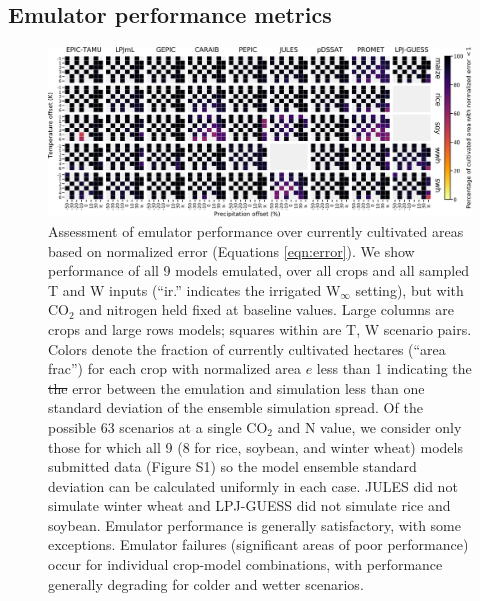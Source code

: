 \documentclass[gmdd]{copernicus} %
\providecommand{\DIFdel}[1]{{\protect\color{red}\sout{#1}}}                      %
\providecommand{\DIFdelFL}[1]{\DIFdel{#1}} %
\providecommand{\DIFdelbeginFL}{} %
\providecommand{\DIFdelendFL}{} %
\begin{document}
\subsection{Emulator performance metrics}
\label{S:4.2}
\begin{figure}[ht]
\centering
    \includegraphics[width=16.3cm]{figures/error_grid_new.png}
    \caption{
    Assessment of emulator performance over currently cultivated areas based on normalized error (Equations \ref{eqn:error}). 
    We show performance of all 9 models emulated, over all crops and all sampled T and W inputs (``ir.'' indicates the irrigated W$_{\infty}$ setting), but with CO$_2$ and nitrogen held fixed at baseline values. 
    Large columns are crops and large rows models; squares within are T, W scenario pairs. 
    Colors denote the fraction of currently cultivated hectares (``area frac'') for each crop with normalized area $e$ less than 1 indicating the \DIFdelbeginFL \DIFdelFL{the }\DIFdelendFL error between the emulation and simulation less than one standard deviation of the ensemble simulation spread. 
    Of the possible 63 scenarios at a single CO$_2$ and N value, we consider only those for which all 9 (8 for rice, soybean, and winter wheat) models submitted data (Figure S1) so the model ensemble standard deviation can be calculated uniformly in each case. 
    JULES did not simulate winter wheat and LPJ-GUESS did not simulate rice and soybean. Emulator performance is generally satisfactory, with some exceptions. 
    Emulator failures (significant areas of poor performance) occur for individual crop-model combinations, with performance generally degrading for colder and wetter scenarios.
    }
   \label{fig:error_360}
\end{figure}
\end{document}
